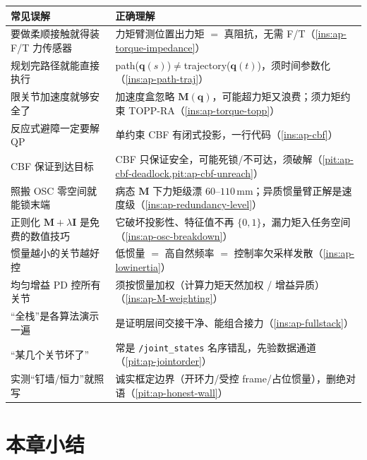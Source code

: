 \begin{table}[H]\centering\small
\begin{tabular}{p{} p{}}
\toprule
\textbf{常见误解} & \textbf{正确理解} \\
\midrule
要做柔顺接触就得装 F/T 力传感器 & 力矩臂测位置出力矩 $=$ 真阻抗，无需 F/T（\cref{ins:ap-torque-impedance}）\\
规划完路径就能直接执行 & path($\mathbf{q}(s)$)$\ne$trajectory($\mathbf{q}(t)$)，须时间参数化（\cref{ins:ap-path-traj}）\\
限关节加速度就够安全了 & 加速度盒忽略 $\mathbf{M}(\mathbf{q})$，可能超力矩又浪费；须力矩约束 TOPP-RA（\cref{ins:ap-torque-topp}）\\
反应式避障一定要解 QP & 单约束 CBF 有闭式投影，一行代码（\cref{ins:ap-cbf}）\\
CBF 保证到达目标 & CBF 只保证安全，可能死锁/不可达，须破解（\cref{pit:ap-cbf-deadlock,pit:ap-cbf-unreach}）\\
照搬 OSC 零空间就能锁末端 & 病态 $\mathbf{M}$ 下力矩级漂 $60$--$110\,\mathrm{mm}$；异质惯量臂正解是速度级（\cref{ins:ap-redundancy-level}）\\
正则化 $\mathbf{M}+\lambda\mathbf{I}$ 是免费的数值技巧 & 它破坏投影性、特征值不再 $\{0,1\}$，漏力矩入任务空间（\cref{ins:ap-osc-breakdown}）\\
惯量越小的关节越好控 & 低惯量 $=$ 高自然频率 $=$ 控制率欠采样发散（\cref{ins:ap-lowinertia}）\\
均匀增益 PD 控所有关节 & 须按惯量加权（计算力矩天然加权 / 增益异质）（\cref{ins:ap-M-weighting}）\\
“全栈”是各算法演示一遍 & 是证明层间交接干净、能组合接力（\cref{ins:ap-fullstack}）\\
“某几个关节坏了” & 常是 \texttt{/\allowbreak joint\_states} 名序错乱，先验数据通道（\cref{pit:ap-jointorder}）\\
实测“钉墙/恒力”就照写 & 诚实框定边界（开环力/受控 frame/占位惯量），删绝对语（\cref{pit:ap-honest-wall}）\\
\bottomrule
\end{tabular}
\end{table}

\section*{本章小结}

